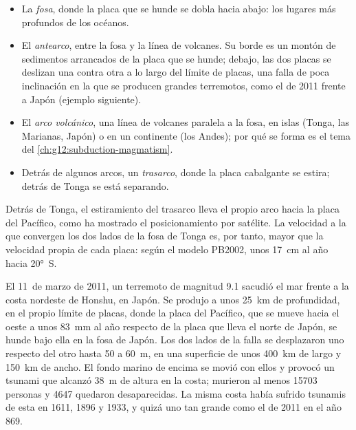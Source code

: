 \begin{itemize}
  \item La \emph{fosa}, donde la placa que se hunde se dobla hacia abajo: los
        lugares más profundos de los océanos.
  \item El \emph{antearco}, entre la fosa y la línea de volcanes. Su borde es
        un montón de sedimentos arrancados de la placa que se hunde; debajo,
        las dos placas se deslizan una contra otra a lo largo del límite de
        placas, una falla de poca inclinación en la que se producen grandes
        terremotos, como el de 2011 frente a Japón (ejemplo siguiente).
  \item El \emph{arco volcánico}, una línea de volcanes paralela a la fosa,
        en islas (Tonga, las Marianas, Japón) o en un continente (los Andes);
        por qué se forma es el tema del \cref{ch:g12:subduction-magmatism}.
  \item Detrás de algunos arcos, un \emph{trasarco}, donde la placa
        cabalgante se estira; detrás de Tonga se está separando.
\end{itemize}

Detrás de Tonga, el estiramiento del trasarco lleva el propio arco hacia la
placa del Pacífico, como ha mostrado el posicionamiento por satélite. La velocidad a la que convergen los dos lados de la fosa de Tonga
es, por tanto, mayor que la velocidad propia de cada placa: según el modelo
PB2002, unos \qty{17}{cm} al año hacia \ang{20}~S.

\begin{example}\label{ex:g11:subduction-zones:tohoku}
El 11~de marzo de 2011, un terremoto de magnitud 9.1 sacudió el mar frente a
la costa nordeste de Honshu, en Japón. Se produjo a unos \qty{25}{km} de
profundidad, en el propio límite de placas, donde la placa del Pacífico, que
se mueve hacia el oeste a unos \qty{83}{mm} al año respecto de la placa que
lleva el norte de Japón, se hunde bajo ella en la fosa de Japón. Los dos lados
de la falla se desplazaron uno respecto del otro hasta 50 a \qty{60}{m}, en
una superficie de unos \qty{400}{km} de largo y \qty{150}{km} de ancho. El
fondo marino de encima se movió con ellos y provocó un tsunami que alcanzó
\qty{38}{m} de altura en la costa; murieron al menos \num{15703} personas y
\num{4647} quedaron desaparecidas. La misma costa había sufrido tsunamis de
esta  en 1611, 1896 y 1933, y quizá uno tan grande como el
de 2011 en el año 869.
\end{example}

